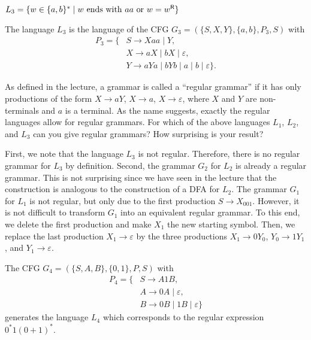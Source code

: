 \documentclass{exercise}
\begin{document}
\subtask $L_3 = \{w \in \{a,b\}^* \mid w \text{ ends with }aa\text{ or }w = w^{\textsf{R}} \}$

  \begin{solution}
    The language $L_3$ is the language of the CFG $G_3=(\{S,X,Y\},\{a,b\},P_3,S)$ with
    \begin{align*}
      P_3 = \{ & S \to Xaa \mid Y,\\
               & X \to aX \mid bX \mid \varepsilon,\\
               & Y \to aYa \mid bYb \mid a \mid b \mid \varepsilon \}.
    \end{align*}
  \end{solution}

\enlargethispage{10mm}

\subtask As defined in the lecture, a grammar is called a ``regular grammar''
  if it has only productions of the form $X\to aY$, $X\to a$, $X\to\varepsilon$,
  where $X$ and $Y$ are non-terminals and $a$ is a terminal.  As the name
  suggests, exactly the regular languages allow for regular grammars.  For
  which of the above languages $L_1$, $L_2$, and $L_3$ can you give regular
  grammars?  How surprising is your result?

  \begin{solution}
    First, we note that the language $L_3$ is not regular.  Therefore, there is no
    regular grammar for $L_3$ by definition.  Second, the grammar $G_2$ for $L_2$ is
    already a regular grammar.  This is not surprising since we have seen in the lecture
    that the construction is analogous to the construction of a DFA for $L_2$.
    The grammar $G_1$ for $L_1$ is not regular, but only due to the first production $S\to X_001$.
    However, it is not difficult to transform $G_1$ into an equivalent regular grammar.
    To this end, we delete the first production and make $X_1$ the new starting symbol.
    Then, we replace the last production $X_1\to\varepsilon$ by the three productions
    $X_1\to 0Y_0$, $Y_0\to 1Y_1$, and $Y_1\to\varepsilon$.
  \end{solution}


The CFG $G_4=(\{S,A,B\},\{0,1\},P,S)$ with
\begin{align*}
  P_4 = \{ & S \to A1B, \\
           & A \to 0A \mid \varepsilon,\\
           & B \to 0B \mid 1B \mid \varepsilon\}
\end{align*}
generates the language $L_4$ which corresponds to the regular expression $0^*1(0+1)^*$.
\end{document}
